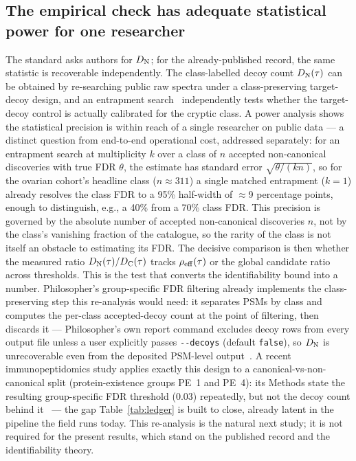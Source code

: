 \subsection{The empirical check has adequate statistical power for one researcher}
The standard asks authors for $D_{\mathrm{N}}$; for the already-published record, the same statistic is recoverable independently. The class-labelled decoy count $D_{\mathrm{N}}(\tau)$ can be obtained by re-searching public raw spectra under a class-preserving target-decoy design, and an entrapment search~\cite{r8,r9} independently tests whether the target-decoy control is actually calibrated for the cryptic class. A power analysis shows the statistical precision is within reach of a single researcher on public data --- a distinct question from end-to-end operational cost, addressed separately: for an entrapment search at multiplicity $k$ over a class of $n$ accepted non-canonical discoveries with true FDR $\theta$, the estimate has standard error $\sqrt{\theta/(kn)}$, so for the ovarian cohort's headline class ($n \approx 311$) a single matched entrapment ($k = 1$) already resolves the class FDR to a 95\% half-width of $\approx$9 percentage points, enough to distinguish, e.g., a 40\% from a 70\% class FDR. This precision is governed by the absolute number of accepted non-canonical discoveries $n$, not by the class's vanishing fraction of the catalogue, so the rarity of the class is not itself an obstacle to estimating its FDR. The decisive comparison is then whether the measured ratio $D_{\mathrm{N}}(\tau)/D_{\mathrm{C}}(\tau)$ tracks $\rho_{\mathrm{eff}}(\tau)$ or the global candidate ratio across thresholds. This is the test that converts the identifiability bound into a number. Philosopher's group-specific FDR filtering already implements the class-preserving step this re-analysis would need: it separates PSMs by class and computes the per-class accepted-decoy count at the point of filtering, then discards it --- Philosopher's own report command excludes decoy rows from every output file unless a user explicitly passes \texttt{-{}-decoys} (default \texttt{false}), so $D_{\mathrm{N}}$ is unrecoverable even from the deposited PSM-level output~\cite{r26}. A recent immunopeptidomics study applies exactly this design to a canonical-vs-non-canonical split (protein-existence groups PE~1 and PE~4): its Methods state the resulting group-specific FDR threshold (0.03) repeatedly, but not the decoy count behind it~\cite{r27} --- the gap Table~\ref{tab:ledger} is built to close, already latent in the pipeline the field runs today. This re-analysis is the natural next study; it is not required for the present results, which stand on the published record and the identifiability theory.


